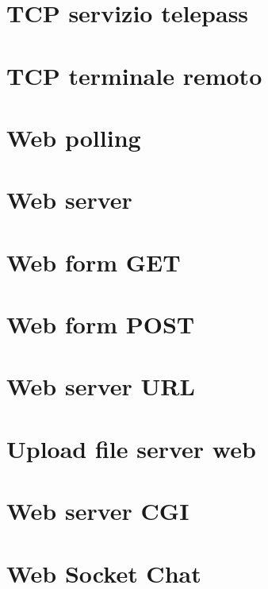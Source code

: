 \documentclass[11pt]{article}
\begin{document}
\section{TCP servizio telepass}

\newpage

\section{TCP terminale remoto}

\newpage

\section{Web polling}

\newpage

\section{Web server}

\newpage

\section{Web form GET}

\newpage

\section{Web form POST}

\newpage

\section{Web server URL}

\newpage

\section{Upload file server web}

\newpage

\section{Web server CGI}

\newpage

\section{Web Socket Chat}

\newpage
\end{document}
